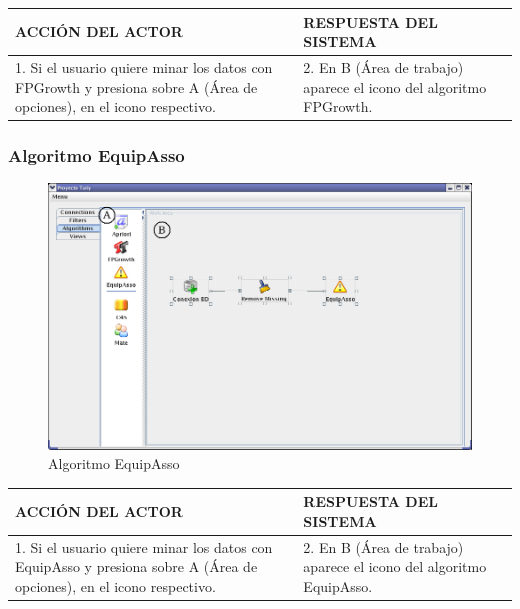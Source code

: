 \begin{center}
\begin{tabular}{|p{60mm}|p{60mm}|}\hline
ACCI\'ON DEL ACTOR & RESPUESTA DEL SISTEMA \\ \hline
1. Si el usuario quiere minar los datos con FPGrowth y presiona sobre A (\'Area de opciones), en el icono respectivo.
& 2. En B (\'Area de trabajo) aparece el icono del algoritmo FPGrowth. \\ \hline
\end{tabular}
\end{center}
\newpage

\subsubsection{Algoritmo EquipAsso}
\begin{figure}[h]
 \centering
 \includegraphics[width=1\textwidth]{images/a3.png}
 \caption{Algoritmo EquipAsso}
\end{figure}

\begin{center}
\begin{tabular}{|p{60mm}|p{60mm}|}\hline
ACCI\'ON DEL ACTOR & RESPUESTA DEL SISTEMA \\ \hline
1. Si el usuario quiere minar los datos con EquipAsso y presiona sobre A (\'Area de opciones), en el icono
respectivo. & 2. En B (\'Area de trabajo) aparece el icono del algoritmo EquipAsso. \\ \hline
\end{tabular}
\end{center}
\newpage

